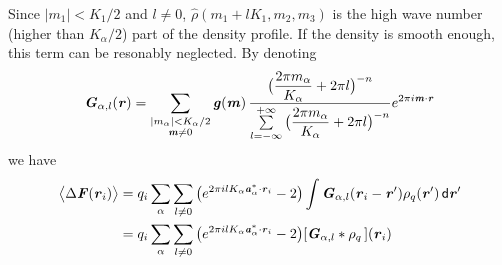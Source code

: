 \documentclass[aps,pre,preprint]{revtex4}
\renewcommand{\v}[1]{\textbf{\textit{#1}}}
\renewcommand{\d}[1]{\textsf{#1}}
\begin{document}
Since $\vert m_1\vert < K_1/2$ and $l\neq 0$, $\hat\rho(m_1+lK_1, m_2, m_3)$ is
the high wave number (higher than $K_\alpha / 2$) part of the density profile.
If the density is smooth enough, this term can be resonably neglected.
By denoting
\begin{align}
  \v G_{\alpha,l}(\v r) =
  \sum_{
    \begin{subarray}{c}
      \vert m_{\alpha}\vert < K_\alpha/2\\
      \v m\neq 0
    \end{subarray}}
  \v g(\v m)\,
  \frac
  {\big(\dfrac{2\pi m_\alpha}{K_\alpha} + 2\pi l\big)^{-n}}
  {\sum\limits_{l=-\infty}^{+\infty}
    \big(\dfrac{2\pi m_\alpha}{K_\alpha} + 2\pi l\big)^{-n}}
  e^{2\pi i\v m\cdot\v r}
\end{align}
we have
\begin{align}
  \big\langle
  \Delta\v F(\v r_i)
  \big\rangle
  &= 
  q_i\sum_{\alpha}\sum_{l\neq 0}
  \big(
  e^{2\pi i l K_\alpha\v a^\ast_\alpha\cdot \v r_i} - 2
  \big)
  \int
  \v G_{\alpha,l}(\v r_i - \v r') \rho_q(\v r')\,\d d\v r' \\
  & =
  q_i\sum_{\alpha}\sum_{l\neq 0}
  \big(
  e^{2\pi i l K_\alpha\v a^\ast_\alpha\cdot \v r_i} - 2
  \big)
  [\v G_{\alpha,l}\ast\rho_q\,] (\v r_i)
\end{align}
\end{document}
